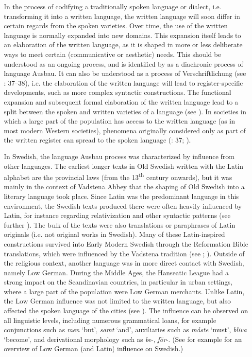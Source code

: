 \documentclass[output=paper]{langscibook}
\begin{document}
In the process of codifying a traditionally spoken language or dialect, i.e. transforming it into a written language, the written language will soon differ in certain regards from the spoken varieties. Over time, the use of the written language is normally expanded into new domains. This expansion itself leads to an elaboration of the written language, as it is shaped in more or less deliberate ways to meet certain (communicative or aesthetic) needs. This should be understood as an ongoing process, and is identified by \citet{Kloss1967} as a diachronic process of language Ausbau. It can also be understood as a process of Verschriftlichung (see \citealt{Fischer2007}: 37–38), i.e. the elaboration of the written language will lead to register-specific developments, such as more complex syntactic constructions. The functional expansion and subsequent formal elaboration of the written language lead to a split between the spoken and written varieties of a language (see \citealt{Hoder2009}). In societies in which a large part of the population has access to the written language (as in most modern Western societies), phenomena originally considered only as part of the written register can spread to the spoken language (\citealt{Fischer2007}: 37; \citealt{Weis2004}). 



In Swedish, the language Ausbau process was characterized by influence from other languages. The earliest longer texts in Old Swedish written with the Latin alphabet are the provincial laws (from the 13\textsuperscript{th} century onwards), but it was mainly in the context of Vadstena Abbey that the shaping of Old Swedish into a literary language took place. Since Latin was the predominant language in this environment, the Swedish texts produced there were often heavily influenced by Latin, for instance regarding relativization and other syntactic patterns (see further \citealt{Hoder2009, Hoder2010, Wollin1981, Wollin1983}). The bulk of the texts were also translations or paraphrases of Latin originals (i.e. not original works in Swedish). Many of these Latin-inspired constructions survived into Early Modern Swedish through the Reformation Bible translations, which were influenced by the Vadstena tradition (see \citealt{Stahle1970}; \citealt{Teleman2002, Teleman2003Swedish}). Outside of the religious context, another language was in more direct contact with Swedish, namely Low German. During the Middle Ages, the Hanseatic League had a strong impact on the Scandinavian countries, in particular in urban settings, where a large part of the population were Low German merchants. Unlike Latin, the Low German influence was not limited to the written language, but also affected the spoken language of the cities (see \citealt{Braunmuller1997,Braunmuller2005,}). The influence can be observed on all linguistic levels, including numerous grammatical loans, for example conjunctions such as \textit{men} ‘but’, \textit{samt} ‘and’, auxiliaries such as \textit{måste} ‘must’, \textit{bliva} ‘become’, and derivational morphology such as \textit{be}{}-, \textit{för}{}-. (See for example \citealt{Braunmuller2005} for an overview of Low German (and Latin) influence on Swedish.)
\end{document}
